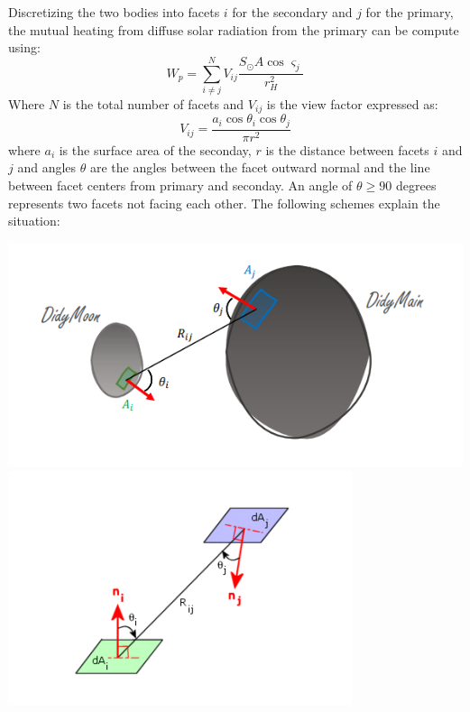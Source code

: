 Discretizing the two bodies into facets $i$ for the secondary and $j$ for the primary, the mutual heating from diffuse solar radiation from the primary can be compute using:
\begin{equation}
    W_p=\sum_{i\neq j}^N V_{ij}\frac{S_{\odot}A\cos\varsigma_j}{r_H^2}
    \label{eq:4.2}
\end{equation}
Where $N$ is the total number of facets and $V_{ij}$ is the view factor expressed as:
\begin{equation}
    V_{ij}=\frac{a_i\cos\theta_i\cos\theta_j}{\pi r^2}
    \label{eq:4.3}
\end{equation}
where $a_i$ is the surface area of the seconday, $r$ is the distance between facets $i$ and $j$ and angles $\theta$ are the angles between the facet outward normal and the line between facet centers from primary and seconday. An angle of $\theta\geq90$ degrees represents two facets not facing each other. The following schemes explain the situation:
\begin{center}
    \includegraphics[width=\linewidth]{rsc/viewfac1.png} 
    \includegraphics[width=\linewidth]{rsc/viewfac2.png}
    \label{fig:4.1}
\end{center}

